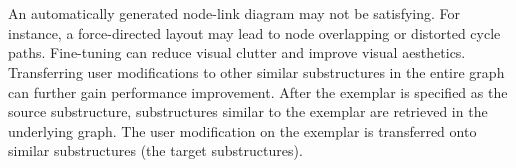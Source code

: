 \section{}
{
An automatically generated node-link diagram may not be satisfying. For instance, a force-directed layout may lead to node overlapping or distorted cycle paths.
Fine-tuning can reduce visual clutter and improve visual aesthetics.
Transferring user modifications to other similar substructures in the entire graph can further gain performance improvement. After the exemplar is specified as the source substructure, 
substructures similar to the exemplar are retrieved in the underlying graph. 
The user modification on the exemplar is transferred onto similar substructures (the target substructures).
}



